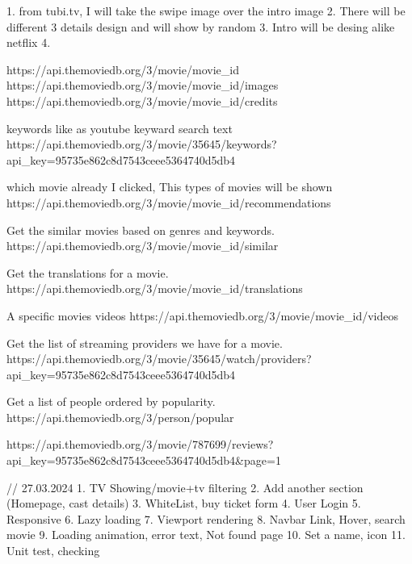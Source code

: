 1. from tubi.tv, I will take the swipe image over the intro image
2. There will be different 3 details design and will show by random
3. Intro will be desing alike netflix
4.

https://api.themoviedb.org/3/movie/{movie_id}
https://api.themoviedb.org/3/movie/{movie_id}/images
https://api.themoviedb.org/3/movie/{movie_id}/credits

keywords like as youtube keyward search text
https://api.themoviedb.org/3/movie/35645/keywords?api_key=95735e862c8d7543ceee5364740d5db4

which movie already I clicked, This types of movies will be shown
https://api.themoviedb.org/3/movie/{movie_id}/recommendations

Get the similar movies based on genres and keywords.
https://api.themoviedb.org/3/movie/{movie_id}/similar

Get the translations for a movie.
https://api.themoviedb.org/3/movie/{movie_id}/translations

A specific movies videos
https://api.themoviedb.org/3/movie/{movie_id}/videos

Get the list of streaming providers we have for a movie.
https://api.themoviedb.org/3/movie/35645/watch/providers?api_key=95735e862c8d7543ceee5364740d5db4

Get a list of people ordered by popularity.
https://api.themoviedb.org/3/person/popular

https://api.themoviedb.org/3/movie/787699/reviews?api_key=95735e862c8d7543ceee5364740d5db4&page=1

// 27.03.2024
1. TV Showing/movie+tv filtering
2. Add another section (Homepage, cast details)
3. WhiteList, buy ticket form
4. User Login
5. Responsive
6. Lazy loading
7. Viewport rendering
8. Navbar Link, Hover, search movie
9. Loading animation, error text, Not found page
10. Set a name, icon
11. Unit test, checking